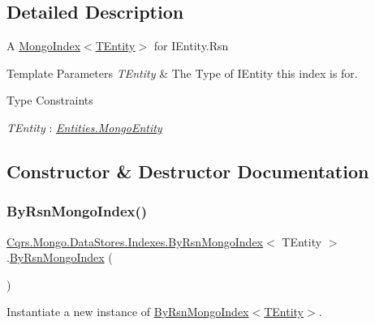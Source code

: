 \subsection{Detailed Description}
A \hyperlink{classCqrs_1_1Mongo_1_1DataStores_1_1Indexes_1_1MongoIndex_a7affbb063520cd8c8bda27f8478efd06_a7affbb063520cd8c8bda27f8478efd06}{Mongo\+Index$<$\+T\+Entity$>$} for I\+Entity.\+Rsn 


\begin{DoxyTemplParams}{Template Parameters}
{\em T\+Entity} & The Type of I\+Entity this index is for.\\
\hline
\end{DoxyTemplParams}
\begin{Desc}
\item[Type Constraints]\begin{description}
\item[{\em T\+Entity} : {\em \hyperlink{classCqrs_1_1Mongo_1_1Entities_1_1MongoEntity}{Entities.\+Mongo\+Entity}}]\end{description}
\end{Desc}


\subsection{Constructor \& Destructor Documentation}
\mbox{\label{classCqrs_1_1Mongo_1_1DataStores_1_1Indexes_1_1ByRsnMongoIndex_ae28ab1125093922dc3eeb3a19b821224_ae28ab1125093922dc3eeb3a19b821224}} 
\subsubsection{\texorpdfstring{By\+Rsn\+Mongo\+Index()}{ByRsnMongoIndex()}}
{\footnotesize\ttfamily \hyperlink{classCqrs_1_1Mongo_1_1DataStores_1_1Indexes_1_1ByRsnMongoIndex}{Cqrs.\+Mongo.\+Data\+Stores.\+Indexes.\+By\+Rsn\+Mongo\+Index}$<$ T\+Entity $>$.\hyperlink{classCqrs_1_1Mongo_1_1DataStores_1_1Indexes_1_1ByRsnMongoIndex}{By\+Rsn\+Mongo\+Index} (\begin{DoxyParamCaption}{ }\end{DoxyParamCaption})\hspace{0.3cm}{\ttfamily [protected]}}



Instantiate a new instance of \hyperlink{classCqrs_1_1Mongo_1_1DataStores_1_1Indexes_1_1ByRsnMongoIndex_ae28ab1125093922dc3eeb3a19b821224_ae28ab1125093922dc3eeb3a19b821224}{By\+Rsn\+Mongo\+Index$<$\+T\+Entity$>$}. 

